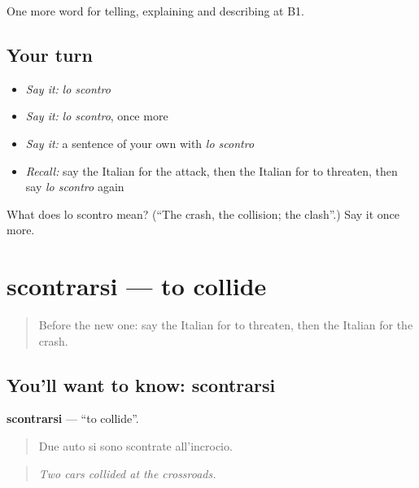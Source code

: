 \begin{grammarlens}[title={What you've built}]
One more word for telling, explaining and describing at B1.
\end{grammarlens}

\subsection*{Your turn}
\begin{itemize}
\raggedright
  \item \emph{Say it:} \emph{lo scontro}
  \item \emph{Say it:} \emph{lo scontro}, once more
  \item \emph{Say it:} a sentence of your own with \emph{lo scontro}
  \item \emph{Recall:} say the Italian for the attack, then the Italian for to threaten, then say \emph{lo scontro} again
\end{itemize}

\begin{tcolorbox}[breakable,colback=teal!4,colframe=teal!35!black,title={Before you move on}]
What does lo scontro mean? (\textquotedblleft{}The crash, the collision; the clash\textquotedblright{}.) Say it once more.
\end{tcolorbox}
\section[scontrarsi]{scontrarsi — to collide}

\label{lesson:IT-C299-scontrarsi}



\begin{quote}
Before the new one: say the Italian for to threaten, then the Italian for the crash.
\end{quote}

\subsection*{You'll want to know: scontrarsi}
\textbf{scontrarsi} — \textquotedblleft{}to collide\textquotedblright{}.

\begin{quote}
Due auto si sono scontrate all'incrocio.
\end{quote}

\begin{quote}
\emph{Two cars collided at the crossroads.}
\end{quote}

